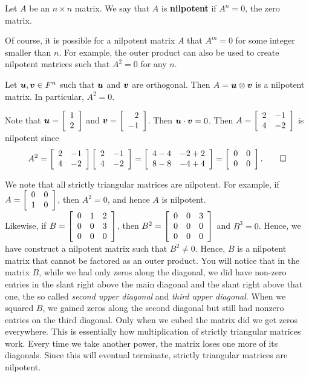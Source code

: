 \begin{Def} Let $A$ be an $n\times n$ matrix. We say that $A$ is \textbf{nilpotent} if $A^n=0$, the zero matrix.
\end{Def}\vs

Of course, it is possible for a nilpotent matrix $A$ that $A^m=0$ for some integer smaller than $n$. For example, the outer product can also be used to create nilpotent matrices such that $A^2=0$ for any $n$.\\

\begin{Thm} Let $\bb u, \bb v\in F^n$ such that $\bb u$ and $\bb v$ are orthogonal. Then $A=\bb u \otimes \bb v$ is a nilpotent matrix. In particular, $A^2=0$.
\end{Thm}\vs

\begin{Exam} Note that $\bb u = \vr{1\\2}$ and $\bb v = \vr{2\\-1}$. Then $\bb u \cdot \bb v = 0$. Then $A =\mtx{rr}{2 & -1 \\ 4 & -2}$ is nilpotent since \[A^2 =  \mtx{rr}{2 & -1 \\ 4 & -2}\mtx{rr}{2 & -1 \\ 4 & -2} =\mtx{rr}{4 - 4 & -2+2 \\ 8-8 & -4+4} = \mtx{rr}{0&0\\0&0}. \qedhere\]
\end{Exam}

\begin{Exam} We note that all strictly triangular matrices are nilpotent. For example, if $A=\mtx{rr}{0&0\\1&0}$, then $A^2=0$, and hence $A$ is nilpotent.\\

Likewise, if $B=\mtx{rrr}{0&1&2\\0&0&3\\0&0&0}$, then $B^2=\mtx{rrr}{0&0&3\\0&0&0\\0&0&0}$ and $B^3 = 0$. Hence, we have construct a nilpotent matrix such that $B^2\neq 0$. Hence, $B$ is a nilpotent matrix that cannot be factored as an outer product. You will notice that in the matrix $B$, while we had only zeros along the diagonal, we did have non-zero entries in the slant right above the main diagonal and the slant right above that one, the so called \emph{second upper diagonal} and \emph{third upper diagonal}. When we squared $B$, we gained zeros along the second diagonal but still had nonzero entries on the third diagonal. Only when we cubed the matrix did we get zeros everywhere. This is essentially how multiplication of strictly triangular matrices work. Every time we take another power, the matrix loses one more of its diagonals. Since this will eventual terminate, strictly triangular matrices are nilpotent.
\end{Exam}\vs

